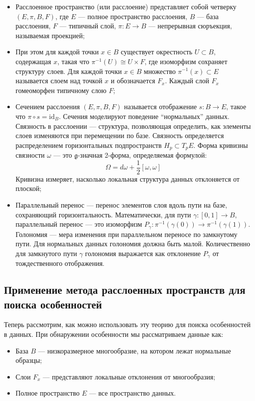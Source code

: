 \documentclass[a4paper,12pt]{extarticle}
\begin{document}
\begin{itemize}
\item Расслоенное пространство (или расслоение) представляет собой четверку $(E, \pi, B, F)$, где $E$ — полное пространство расслоения, $B$ — база расслоения, $F$ — типичный слой, $\pi: E \to B$ — непрерывная сюръекция, называемая проекцией;

\item При этом для каждой точки $x \in B$ существует окрестность $U \subset B$, содержащая $x$, такая что $\pi^{-1}(U) \cong U \times F$, где изоморфизм сохраняет структуру слоев. Для каждой точки $x \in B$ множество $\pi^{-1}(x) \subset E$ называется слоем над точкой $x$ и обозначается $F_x$. Каждый слой $F_x$ гомеоморфен типичному слою $F$;

\item Сечением расслоения $(E, \pi, B, F)$ называется отображение $s: B \to E$, такое что $\pi \circ s = \text{id}_B$. Сечения моделируют поведение ``нормальных'' данных. Связность в расслоении — структура, позволяющая определить, как элементы слоев изменяются при перемещении по базе. Связность определяется распределением горизонтальных подпространств $H_p \subset T_p E$. Форма кривизны связности $\omega$ — это $\mathfrak{g}$-значная 2-форма, определяемая формулой:
\begin{equation}
\Omega = d\omega + \frac{1}{2}[\omega, \omega]
\end{equation}
Кривизна измеряет, насколько локальная структура данных отклоняется от плоской;

\item Параллельный перенос — перенос элементов слоя вдоль пути на базе, сохраняющий горизонтальность. Математически, для пути $\gamma: [0,1] \to B$, параллельный перенос — это изоморфизм $P_\gamma: \pi^{-1}(\gamma(0)) \to \pi^{-1}(\gamma(1))$. Голономия — мера изменения при параллельном переносе по замкнутому пути. Для нормальных данных голономия должна быть малой. Количественно для замкнутого пути $\gamma$ голономия выражается как отклонение $P_\gamma$ от тождественного отображения.

\end{itemize}

\subsection{Применение метода расслоенных пространств для поиска особенностей}

Теперь рассмотрим, как можно использовать эту теорию для поиска особенностей в данных. При обнаружении особенности мы рассматриваем данные как:
\begin{itemize}
    \item База $B$ — низкоразмерное многообразие, на котором лежат нормальные образцы;
    \item Слои $F_x$ — представляют локальные отклонения от многообразия;
    \item Полное пространство $E$ — все пространство данных.
\end{itemize}
\end{document}
